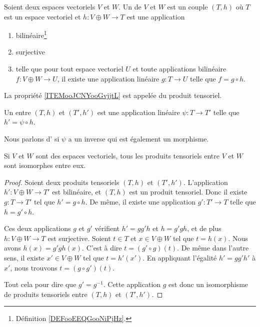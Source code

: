 \begin{definition}       \label{DEFooXKKQooAvWRNp}
    Soient deux espaces vectoriels \( V\) et \( W\). Un  de \( V\) et \( W\) est un couple \( (T,h)\) où \( T\) est un espace vectoriel et \( h\colon V\oplus W\to T\) est une application
    \begin{enumerate}
        \item
            bilinéaire\footnote{Définition \ref{DEFooEEQGooNiPjHz}.}
        \item
            surjective
        \item       \label{ITEMooJCNYooGvjjtL}
            telle que pour tout espace vectoriel \( U\) et toute applications bilinéaire \( f\colon V\oplus W\to U\), il existe une application linéaire \( g\colon T\to U\) telle que \( f=g\circ h\).
    \end{enumerate}
    La propriété \ref{ITEMooJCNYooGvjjtL} est appelée  du produit tensoriel.
\end{definition}

\begin{definition}
    Un  entre \( (T,h)\) et \( (T',h')\) est une application linéaire \( \psi\colon T\to T'\) telle que \( h'=\psi\circ h\).

    Nous parlons d' si \( \psi\) a un inverse qui est également un morphisme.
\end{definition}

\begin{proposition}      \label{PROPooROPHooQXqNzZ}
    Si \( V\) et \( W\) sont des espaces vectoriels, tous les produits tensoriels entre \( V\) et \( W\) sont isomorphes entre eux.
\end{proposition}

\begin{proof}
    Soient deux produits tensoriels \( (T,h)\) et \( (T',h')\). L'application \( h'\colon V\oplus W\to T'\) est bilinéaire, et \( (T,h)\) est un produit tensoriel. Donc il existe \( g\colon T\to T'\) tel que \( h'=g\circ h\). De même, il existe une application \( g'\colon T'\to T\) telle que \( h=g'\circ h\).
    
    Ces deux applications \( g\) et \( g'\) vérifient $h'=gg'h$ et $h=g'gh$, et de plus \( h\colon V\oplus W\to T\) est surjective. Soient \( t\in T\) et \( x\in V\oplus W\) tel que \( t=h(x)\). Nous avons \( h(x)=g'gh(x)\). C'est à dire \( t=(g'\circ g)(t)\). De même dans l'autre sens, il existe \( x'\in V\oplus W\) tel que \( t=h'(x')\). En appliquant l'égalité \( h'=gg'h'\) à \( x'\), nous trouvons \( t=(g\circ g')(t)\).

    Tout cela pour dire que \( g'=g^{-1}\). Cette application \( g\) est donc un isomorphisme de produits tensoriels entre \( (T,h)\) et \( (T',h')\).
\end{proof}

